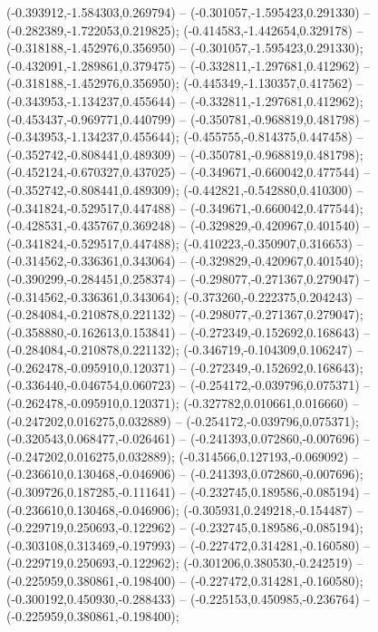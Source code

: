  (-0.393912,-1.584303,0.269794) -- (-0.301057,-1.595423,0.291330) -- (-0.282389,-1.722053,0.219825);
 (-0.414583,-1.442654,0.329178) -- (-0.318188,-1.452976,0.356950) -- (-0.301057,-1.595423,0.291330);
 (-0.432091,-1.289861,0.379475) -- (-0.332811,-1.297681,0.412962) -- (-0.318188,-1.452976,0.356950);
 (-0.445349,-1.130357,0.417562) -- (-0.343953,-1.134237,0.455644) -- (-0.332811,-1.297681,0.412962);
 (-0.453437,-0.969771,0.440799) -- (-0.350781,-0.968819,0.481798) -- (-0.343953,-1.134237,0.455644);
 (-0.455755,-0.814375,0.447458) -- (-0.352742,-0.808441,0.489309) -- (-0.350781,-0.968819,0.481798);
 (-0.452124,-0.670327,0.437025) -- (-0.349671,-0.660042,0.477544) -- (-0.352742,-0.808441,0.489309);
 (-0.442821,-0.542880,0.410300) -- (-0.341824,-0.529517,0.447488) -- (-0.349671,-0.660042,0.477544);
 (-0.428531,-0.435767,0.369248) -- (-0.329829,-0.420967,0.401540) -- (-0.341824,-0.529517,0.447488);
 (-0.410223,-0.350907,0.316653) -- (-0.314562,-0.336361,0.343064) -- (-0.329829,-0.420967,0.401540);
 (-0.390299,-0.284451,0.258374) -- (-0.298077,-0.271367,0.279047) -- (-0.314562,-0.336361,0.343064);
 (-0.373260,-0.222375,0.204243) -- (-0.284084,-0.210878,0.221132) -- (-0.298077,-0.271367,0.279047);
 (-0.358880,-0.162613,0.153841) -- (-0.272349,-0.152692,0.168643) -- (-0.284084,-0.210878,0.221132);
 (-0.346719,-0.104309,0.106247) -- (-0.262478,-0.095910,0.120371) -- (-0.272349,-0.152692,0.168643);
 (-0.336440,-0.046754,0.060723) -- (-0.254172,-0.039796,0.075371) -- (-0.262478,-0.095910,0.120371);
 (-0.327782,0.010661,0.016660) -- (-0.247202,0.016275,0.032889) -- (-0.254172,-0.039796,0.075371);
 (-0.320543,0.068477,-0.026461) -- (-0.241393,0.072860,-0.007696) -- (-0.247202,0.016275,0.032889);
 (-0.314566,0.127193,-0.069092) -- (-0.236610,0.130468,-0.046906) -- (-0.241393,0.072860,-0.007696);
 (-0.309726,0.187285,-0.111641) -- (-0.232745,0.189586,-0.085194) -- (-0.236610,0.130468,-0.046906);
 (-0.305931,0.249218,-0.154487) -- (-0.229719,0.250693,-0.122962) -- (-0.232745,0.189586,-0.085194);
 (-0.303108,0.313469,-0.197993) -- (-0.227472,0.314281,-0.160580) -- (-0.229719,0.250693,-0.122962);
 (-0.301206,0.380530,-0.242519) -- (-0.225959,0.380861,-0.198400) -- (-0.227472,0.314281,-0.160580);
 (-0.300192,0.450930,-0.288433) -- (-0.225153,0.450985,-0.236764) -- (-0.225959,0.380861,-0.198400);
